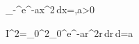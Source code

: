 \int_{-\infty}^{\infty}e^{-ax^2}\,dx=,\qquad a>0

I^2=\int_0^{2\pi}\int_0^\infty e^{-ar^2}r\,dr\,d\theta=\frac\pi a
